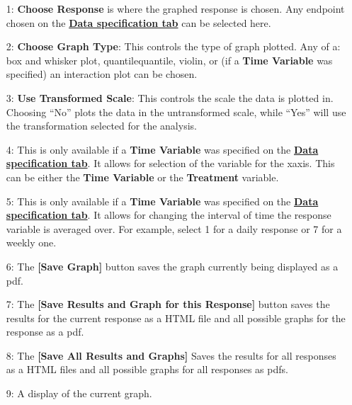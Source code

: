 \documentclass[a4paper]{article}
\begin{document}
	
	\begin{enumerate}
		\item[\begingroup\color{red}1:\endgroup] \textbf{Choose Response} is where the graphed response is chosen. Any endpoint chosen
			on the \hyperlink{fig:DataSpecTab}{\textbf{Data specification tab}} can be selected here. 
			
		\item[\begingroup\color{red}2:\endgroup] \textbf{Choose Graph Type}: This controls the type of graph plotted. Any of a: box and whisker plot, quantile\textendash{}quantile, 
			violin, or (if a \textbf{Time Variable} was specified) an interaction plot can be chosen.   
		
		\item[\begingroup\color{red}3:\endgroup] \textbf{Use Transformed Scale}: This controls the scale the data is plotted in.  Choosing ``No'' plots the data in 
			the untransformed scale, while ``Yes'' will use the transformation selected for the analysis. 
		
		\item[\begingroup\color{red}4:\endgroup] This is only available if a \textbf{Time Variable} was specified
			on the \hyperlink{fig:DataSpecTab}{\textbf{Data specification tab}}.		
			It allows for selection of the variable for the x\textendash{}axis.  This can be either the \textbf{Time Variable}  
			or the  \textbf{Treatment} variable.
		
		\item[\begingroup\color{red}5:\endgroup] This is only available if a \textbf{Time Variable} 
		was specified on the \hyperlink{fig:DataSpecTab}{\textbf{Data specification tab}}.
		 It allows for changing the interval of time the response variable is averaged over. For example, select 1 for a daily response or 7
		 for a weekly one. 
		
		\item[\begingroup\color{red}6:\endgroup] The \textbf{[Save Graph]} button saves the graph currently being displayed as a pdf. 	 
		
		\item[\begingroup\color{red}7:\endgroup] The \textbf{[Save Results and Graph for this Response]} button saves the results for the current response as a HTML file and all possible graphs 
			for the response as a pdf. 
		
		\item[\begingroup\color{red}8:\endgroup] The \textbf{[Save All Results and Graphs]} Saves the results for all responses as a HTML files and all possible graphs 
			for all responses as pdfs. 
		
		\item[\begingroup\color{red}9:\endgroup] A display of the current graph. 			
	\end{enumerate}
	
\end{document}
